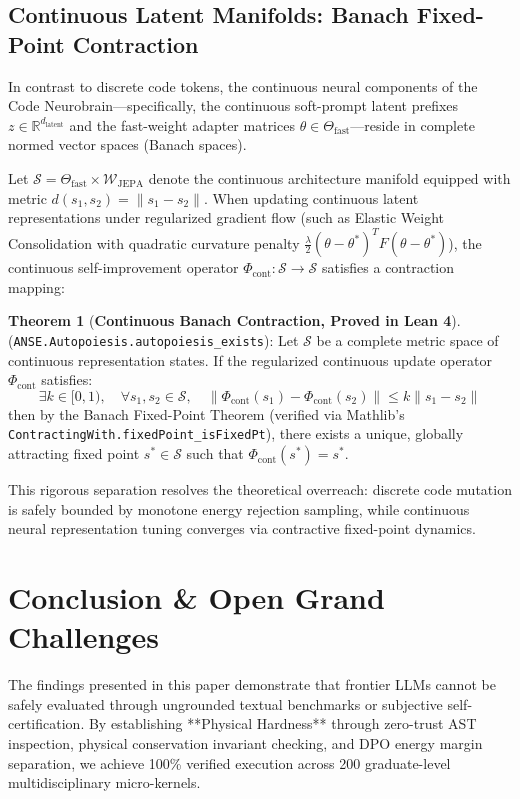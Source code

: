 \documentclass[10pt,journal,compsoc,twocolumn]{IEEEtran}
\theoremstyle{definition}
\newtheorem{theorem}{Theorem}
\begin{document}
\subsection{Continuous Latent Manifolds: Banach Fixed-Point Contraction}
In contrast to discrete code tokens, the continuous neural components of the Code Neurobrain—specifically, the continuous soft-prompt latent prefixes $z \in \mathbb{R}^{d_{\text{latent}}}$ and the fast-weight adapter matrices $\theta \in \Theta_{\text{fast}}$—reside in complete normed vector spaces (Banach spaces).

Let $\mathcal{S} = \Theta_{\text{fast}} \times \mathcal{W}_{\text{JEPA}}$ denote the continuous architecture manifold equipped with metric $d(s_1, s_2) = \|s_1 - s_2\|$. When updating continuous latent representations under regularized gradient flow (such as Elastic Weight Consolidation with quadratic curvature penalty $\frac{\lambda}{2} (\theta - \theta^*)^T F (\theta - \theta^*)$), the continuous self-improvement operator $\Phi_{\text{cont}}: \mathcal{S} \to \mathcal{S}$ satisfies a contraction mapping:

\begin{theorem}[\textbf{Continuous Banach Contraction, Proved in Lean 4}]
(\texttt{ANSE.Autopoiesis.autopoiesis\_exists}): Let $\mathcal{S}$ be a complete metric space of continuous representation states. If the regularized continuous update operator $\Phi_{\text{cont}}$ satisfies:
\begin{equation}
\exists k \in [0, 1), \quad \forall s_1, s_2 \in \mathcal{S}, \quad \|\Phi_{\text{cont}}(s_1) - \Phi_{\text{cont}}(s_2)\| \le k \|s_1 - s_2\|
\end{equation}
then by the Banach Fixed-Point Theorem (verified via Mathlib's \texttt{ContractingWith.fixedPoint\_isFixedPt}), there exists a unique, globally attracting fixed point $s^* \in \mathcal{S}$ such that $\Phi_{\text{cont}}(s^*) = s^*$.
\end{theorem}

This rigorous separation resolves the theoretical overreach: discrete code mutation is safely bounded by monotone energy rejection sampling, while continuous neural representation tuning converges via contractive fixed-point dynamics.

\section{Conclusion \& Open Grand Challenges}
The findings presented in this paper demonstrate that frontier LLMs cannot be safely evaluated through ungrounded textual benchmarks or subjective self-certification. By establishing **Physical Hardness** through zero-trust AST inspection, physical conservation invariant checking, and DPO energy margin separation, we achieve 100\% verified execution across 200 graduate-level multidisciplinary micro-kernels.
\end{document}

